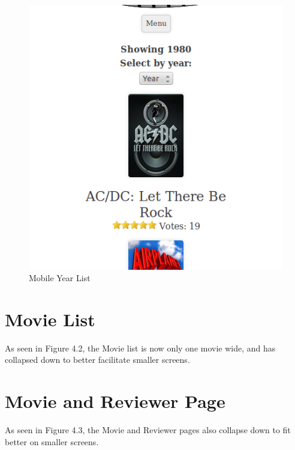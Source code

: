 \documentclass[10pt,a4paper]{scrreprt}
\begin{document}
\begin{figure}[H]
\centering
\includegraphics[scale=.5]{mobile.png}
\caption{Mobile Year List}
\end{figure}

\section{Movie List}
As seen in Figure 4.2, the Movie list is now only one movie wide, and has collapsed down to better facilitate smaller screens.

\section{Movie and Reviewer Page}
As seen in Figure 4.3, the Movie and Reviewer pages also collapse down to fit better on smaller screens.
\end{document}
